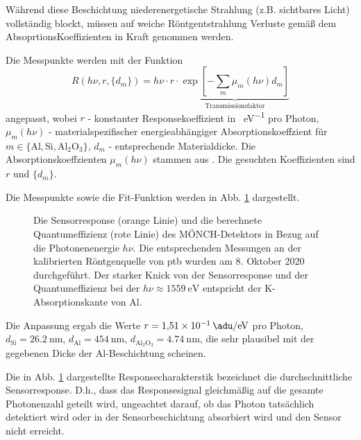 \noindent
Während diese Beschichtung niederenergetische Strahlung (z.B. sichtbares Licht) vollständig blockt, müssen auf weiche Röntgentstrahlung Verluste gemäß dem AbsoprtionsKoeffizienten in Kraft genommen werden.

\noindent
Die Messpunkte werden mit der Funktion
\begin{equation}
    R(h\nu, r, \{d_m\}) = h\nu\cdot r\cdot\underbrace{\exp\left[-\sum_{m}\mu_m(h\nu)d_m\right]}_{\text{Transmissionsfaktor}}
\label{eq:response_durchschnitt}
\end{equation}
angepasst, wobei $r$ - konstanter Responsekoeffizient in \si{\adu\per\eV} pro Photon, $\mu_m(h\nu)$ - materialspezifischer energieabhängiger Absorptionskoeffzient für $m \in \{\text{Al}, \text{Si}, \text{Al$_2$O$_3$}\}$,  $d_m$ - entsprechende Materialdicke. Die Absorptionskoeffzienten $\mu_m(h\nu)$ stammen aus \cite{xray-coeffs}. Die gesuchten Koeffizienten sind $r$ und $\{d_m\}$.

\noindent
Die Messpunkte sowie die Fit-Funktion werden in Abb. \ref{fig:response_moench} dargestellt.
\begin{figure}[H]
    \centering
    
    \caption{Die Sensorresponse (orange Linie) und die berechnete Quantumeffizienz (rote Linie) des MÖNCH-Detektors in Bezug auf die Photonenenergie $h\nu$. Die entsprechenden Messungen an der kalibrierten Röntgenquelle von \gls{ptb} wurden am 8. Oktober 2020 durchgeführt. Der starker Knick von der Sensorresponse und der Quantumeffizienz bei der $h\nu \approx \SI{1559}{\eV}$ entspricht der K-Absorptionskante von Al.}
    \label{fig:response_moench}
\end{figure}
\noindent
Die Anpassung ergab die Werte
$r = \SI{1.51e-1}{\adu\per\eV}$ pro Photon, $d_\text{Si} = \SI{26.2}{\nano\meter}$, $d_\text{Al} = \SI{454}{\nano\meter}$,
$d_\text{Al$_2$O$_3$} = \SI{4.74}{\nano\meter}$, die sehr plausibel mit der gegebenen Dicke der Al-Beschichtung scheinen.

\noindent
Die in Abb. \ref{fig:response_moench} dargestellte Responsecharakterstik bezeichnet die durchschnittliche Sensorresponse. D.h., dass das Responsesignal gleichmäßig auf die gesamte Photonenzahl geteilt wird, ungeachtet darauf, ob das Photon tatsächlich detektiert wird oder in der Sensorbeschichtung absorbiert wird und den Sensor nicht erreicht.

